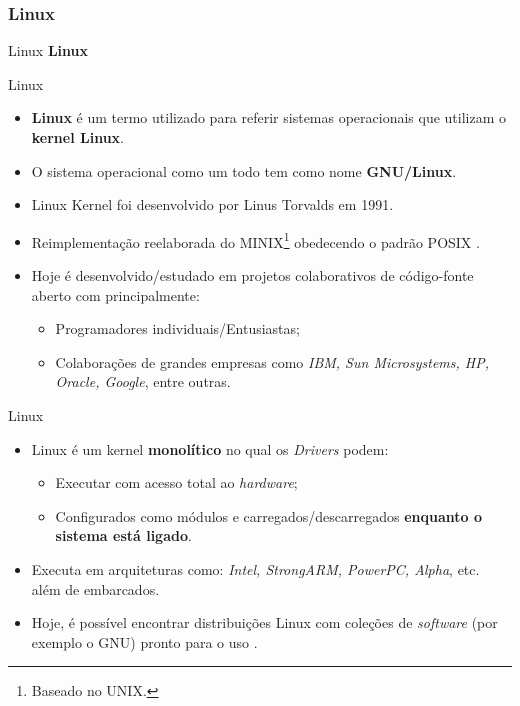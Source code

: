 	\subsubsection{Linux}
	\begin{frame}{Linux}
		\centering \color{blue} {\Huge \textbf{Linux} \\[0.5cm]}%
	\end{frame}
	\begin{frame}{Linux}
		\begin{itemize}
			\setlength\itemsep{0.9em}
			\item \textbf{Linux} é um termo utilizado para referir sistemas operacionais que utilizam o \textbf{kernel Linux}.
			\item O sistema operacional como um todo tem como nome \textbf{GNU/Linux}. 
			\item Linux Kernel foi desenvolvido por Linus Torvalds em 1991.
			\item Reimplementação reelaborada do MINIX\footnote{Baseado no UNIX.} obedecendo o padrão POSIX \cite{nemeth2004manual}.
			\item Hoje é desenvolvido/estudado em projetos colaborativos de código-fonte aberto com principalmente:
			\begin{itemize}
				\setlength\itemsep{0.5em}
				\item Programadores individuais/Entusiastas;
				\item Colaborações de grandes empresas como \textit{IBM, Sun Microsystems, HP, Oracle, Google}, entre outras.
			\end{itemize}
		\end{itemize}
	\end{frame}
	\begin{frame}{Linux}
		\begin{itemize}
			\setlength\itemsep{1em}
			\item Linux é um kernel \textbf{monolítico} no qual os \textit{Drivers} podem:
			\begin{itemize}
				\setlength\itemsep{0.7em}
				\item Executar com acesso total ao \textit{hardware};
				\item Configurados como módulos e carregados/descarregados \textbf{enquanto o sistema está ligado}.
			\end{itemize}
			\item Executa em arquiteturas como: \textit{Intel, StrongARM, PowerPC, Alpha}, etc. além de embarcados.
			\item Hoje, é possível encontrar distribuições Linux com coleções de \textit{software} (por exemplo o GNU) pronto para o uso \cite{campos}.
		\end{itemize}
	\end{frame}
